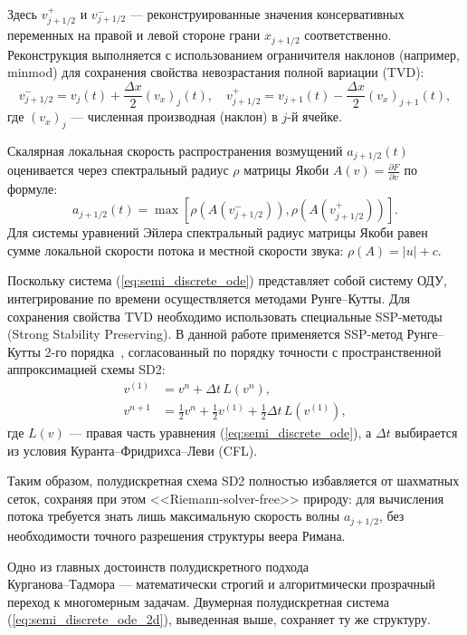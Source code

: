 \documentclass[a4paper,14pt]{extarticle}
\theoremstyle{theorem}
\theoremstyle{lemma}
\begin{document}
Здесь $v_{j+1/2}^+$ и $v_{j+1/2}^-$ — реконструированные значения консервативных переменных на правой и левой стороне грани $x_{j+1/2}$ соответственно. Реконструкция выполняется с использованием ограничителя наклонов (например, minmod) для сохранения свойства невозрастания полной вариации (TVD):
\begin{equation}
\label{eq:kt_reconstruction}
v_{j+1/2}^- = v_j(t) + \frac{\Delta x}{2} (v_x)_j(t), \quad v_{j+1/2}^+ = v_{j+1}(t) - \frac{\Delta x}{2} (v_x)_{j+1}(t),
\end{equation}
где $(v_x)_j$ — численная производная (наклон) в $j$-й ячейке.

Скалярная локальная скорость распространения возмущений $a_{j+1/2}(t)$ оценивается через спектральный радиус $\rho$ матрицы Якоби $A(v) = \frac{\partial F}{\partial v}$ по формуле:
\begin{equation}
\label{eq:kt_speed}
a_{j+1/2}(t) = \max \left[ \rho \left( A(v_{j+1/2}^-) \right), \rho \left( A(v_{j+1/2}^+) \right) \right].
\end{equation}
Для системы уравнений Эйлера спектральный радиус матрицы Якоби равен сумме локальной скорости потока и местной скорости звука: $\rho(A) = |u| + c$.

Поскольку система (\ref{eq:semi_discrete_ode}) представляет собой систему ОДУ, интегрирование по времени осуществляется методами Рунге--Кутты. Для сохранения свойства TVD необходимо использовать специальные SSP-методы (Strong Stability Preserving). В данной работе применяется SSP-метод Рунге--Кутты 2-го порядка~\cite{gottlieb1998}, согласованный по порядку точности с пространственной аппроксимацией схемы SD2:
\begin{equation}
\label{eq:rk2}
\begin{aligned}
v^{(1)} &= v^n + \Delta t \, L(v^n), \\
v^{n+1} &= \frac{1}{2} v^n + \frac{1}{2} v^{(1)} + \frac{1}{2} \Delta t \, L(v^{(1)}),
\end{aligned}
\end{equation}
где $L(v)$ — правая часть уравнения (\ref{eq:semi_discrete_ode}), а $\Delta t$ выбирается из условия Куранта--Фридрихса--Леви (CFL).

Таким образом, полудискретная схема SD2 полностью избавляется от шахматных сеток, сохраняя при этом <<Riemann-solver-free>> природу: для вычисления потока требуется знать лишь максимальную скорость волны $a_{j+1/2}$, без необходимости точного разрешения структуры веера Римана.

Одно из главных достоинств полудискретного подхода \\ Курганова--Тадмора --- математически строгий и алгоритмически прозрачный переход к многомерным задачам. Двумерная полудискретная система (\ref{eq:semi_discrete_ode_2d}), выведенная выше, сохраняет ту же структуру.
\end{document}
